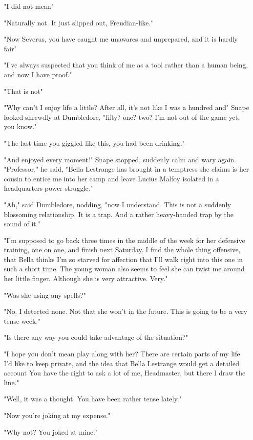 "I did not mean{\el}"

"Naturally not. It just slipped out, Freudian-like."

"Now Severus, you have caught me unawares and unprepared, and it is hardly fair{\el}"

"I've always suspected that you think of me as a tool rather than a human being, and now I have proof."

"That is not{\el}"

"Why can't I enjoy life a little? After all, it's not like I was a hundred and{\el}" Snape looked shrewdly at Dumbledore, "fifty? {\el} one? {\el} two? I'm not out of the game yet, you know."

"The last time you giggled like this, you had been drinking."

"And enjoyed every moment!" Snape stopped, suddenly calm and wary again. "Professor," he said, "Bella Lestrange has brought in a temptress she claims is her cousin to entice me into her camp and leave Lucius Malfoy isolated in a headquarters power struggle."

"Ah," said Dumbledore, nodding, "now I understand. This is not a suddenly blossoming relationship. It is a trap. And a rather heavy-handed trap by the sound of it."

"I'm supposed to go back three times in the middle of the week for her defensive training, one on one, and finish next Saturday. I find the whole thing offensive, that Bella thinks I'm so starved for affection that I'll walk right into this one in such a short time. The young woman also seems to feel she can twist me around her little finger. Although she is very attractive. Very."

"Was she using any spells?"

"No. I detected none. Not that she won't in the future. This is going to be a very tense week."

"Is there any way you could take advantage of the situation?"

"I hope you don't mean play along with her? There are certain parts of my life I'd like to keep private, and the idea that Bella Lestrange would get a detailed account{\el} You have the right to ask a lot of me, Headmaster, but there I draw the line."

"Well, it was a thought. You have been rather tense lately."

"Now you're joking at my expense."

"Why not? You joked at mine."

